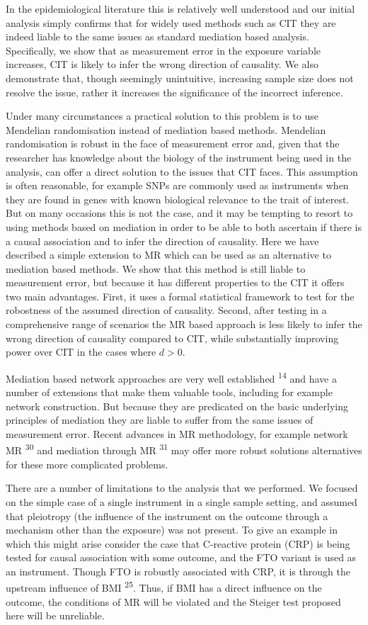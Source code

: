 \documentclass[]{article}
\begin{document}
In the epidemiological literature this is relatively well understood and
our initial analysis simply confirms that for widely used methods such
as CIT they are indeed liable to the same issues as standard mediation
based analysis. Specifically, we show that as measurement error in the
exposure variable increases, CIT is likely to infer the wrong direction
of causality. We also demonstrate that, though seemingly unintuitive,
increasing sample size does not resolve the issue, rather it increases
the significance of the incorrect inference.

Under many circumstances a practical solution to this problem is to use
Mendelian randomisation instead of mediation based methods. Mendelian
randomisation is robust in the face of measurement error and, given that
the researcher has knowledge about the biology of the instrument being
used in the analysis, can offer a direct solution to the issues that CIT
faces. This assumption is often reasonable, for example SNPs are
commonly used as instruments when they are found in genes with known
biological relevance to the trait of interest. But on many occasions
this is not the case, and it may be tempting to resort to using methods
based on mediation in order to be able to both ascertain if there is a
causal association and to infer the direction of causality. Here we have
described a simple extension to MR which can be used as an alternative
to mediation based methods. We show that this method is still liable to
measurement error, but because it has different properties to the CIT it
offers two main advantages. First, it uses a formal statistical
framework to test for the robostness of the assumed direction of
causality. Second, after testing in a comprehensive range of scenarios
the MR based approach is less likely to infer the wrong direction of
causality compared to CIT, while substantially improving power over CIT
in the cases where $d > 0$.

Mediation based network approaches are very well established
\textsuperscript{14} and have a number of extensions that make them
valuable tools, including for example network construction. But because
they are predicated on the basic underlying principles of mediation they
are liable to suffer from the same issues of measurement error. Recent
advances in MR methodology, for example network MR \textsuperscript{30}
and mediation through MR \textsuperscript{31} may offer more robust
solutions alternatives for these more complicated problems.

There are a number of limitations to the analysis that we performed. We
focused on the simple case of a single instrument in a single sample
setting, and assumed that pleiotropy (the influence of the instrument on
the outcome through a mechanism other than the exposure) was not
present. To give an example in which this might arise consider the case
that C-reactive protein (CRP) is being tested for causal association
with some outcome, and the FTO variant is used as an instrument. Though
FTO is robustly associated with CRP, it is through the upstream
influence of BMI \textsuperscript{25}. Thus, if BMI has a direct
influence on the outcome, the conditions of MR will be violated and the
Steiger test proposed here will be unreliable.
\end{document}
